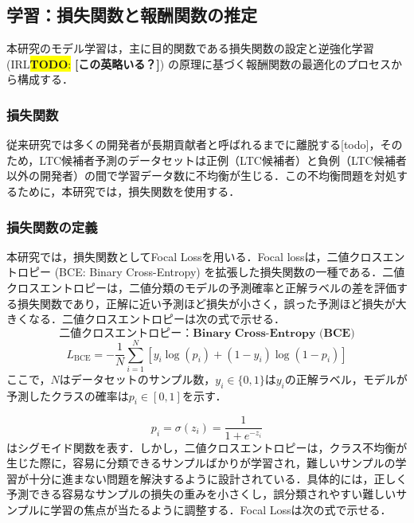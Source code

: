 \documentclass[submit,techrep,noauthor]{ipsj}
\newcommand{\todo}[1]{\colorbox{yellow}{{\bf TODO}:}{\color{red} {\textbf{[#1]}}}}
\begin{document}
\subsection{学習：損失関数と報酬関数の推定}
本研究のモデル学習は，主に目的関数である損失関数の設定と逆強化学習 (IRL\todo{この英略いる？}) の原理に基づく報酬関数の最適化のプロセスから構成する．

\subsubsection{損失関数}

従来研究では多くの開発者が長期貢献者と呼ばれるまでに離脱する[todo]，そのため，LTC候補者予測のデータセットは正例（LTC候補者）と負例（LTC候補者以外の開発者）の間で学習データ数に不均衡が生じる．この不均衡問題を対処するために，本研究では，損失関数を使用する．

\subsubsection{損失関数の定義}

本研究では，損失関数としてFocal Lossを用いる．Focal lossは，二値クロスエントロピー (BCE: Binary Cross-Entropy) を拡張した損失関数の一種である．二値クロスエントロピーは，二値分類のモデルの予測確率と正解ラベルの差を評価する損失関数であり，正解に近い予測ほど損失が小さく，誤った予測ほど損失が大きくなる．二値クロスエントロピーは次の式で示せる．
\[\textbf{二値クロスエントロピー：Binary Cross-Entropy (BCE)}\]
\[
L_{\mathrm{BCE}} = - \frac{1}{N} \sum_{i=1}^{N} \left[ y_i\log(p_i) + (1 - y_i)\log(1 - p_i)\right]
\]
ここで，$N$はデータセットのサンプル数，$y_i \in \{0, 1\}$は$y_i$の正解ラベル，モデルが予測したクラスの確率は$p_i \in [0, 1]$を示す．

\[p_i = \sigma(z_i) = \frac{1}{1 + e^{-z_i}}\]はシグモイド関数を表す．しかし，二値クロスエントロピーは，クラス不均衡が生じた際に，容易に分類できるサンプルばかりが学習され，難しいサンプルの学習が十分に進まない問題を解決するように設計されている．具体的には，正しく予測できる容易なサンプルの損失の重みを小さくし，誤分類されやすい難しいサンプルに学習の焦点が当たるように調整する．Focal Lossは次の式で示せる．

\end{document}
